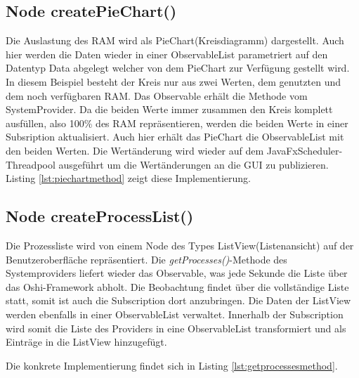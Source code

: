 \subsection{Node createPieChart()}
Die Auslastung des RAM wird als PieChart(Kreisdiagramm) dargestellt. Auch hier werden die Daten wieder in einer ObservableList parametriert auf den Datentyp Data abgelegt welcher von dem PieChart zur Verfügung gestellt wird. In diesem Beispiel besteht der Kreis nur aus zwei Werten, dem genutzten und dem noch verfügbaren RAM. Das Observable erhält die Methode vom SystemProvider. Da die beiden Werte immer zusammen den Kreis komplett ausfüllen, also 100\% des RAM repräsentieren, werden die beiden Werte in einer Subsription aktualisiert. Auch hier erhält das PieChart die ObservableList mit den beiden Werten. Die Wertänderung wird wieder auf dem JavaFxScheduler-Threadpool ausgeführt um die Wertänderungen an die GUI zu publizieren. Listing \ref{lst:piechartmethod} zeigt diese Implementierung.
 
\subsection{Node createProcessList()}
Die Prozessliste wird von einem Node des Types ListView(Listenansicht) auf der Benutzeroberfläche repräsentiert. Die \textit{getProcesses()}-Methode des Systemproviders liefert wieder das Observable, was jede Sekunde die Liste über das Oshi-Framework abholt. Die Beobachtung findet über die vollständige Liste statt, somit ist auch die Subscription dort anzubringen. Die Daten der ListView werden ebenfalls in einer ObservableList verwaltet. Innerhalb der Subscription wird somit die Liste des Providers in eine ObservableList transformiert und als Einträge in die ListView hinzugefügt. 

Die konkrete Implementierung findet sich in Listing \ref{lst:getprocessesmethod}.
